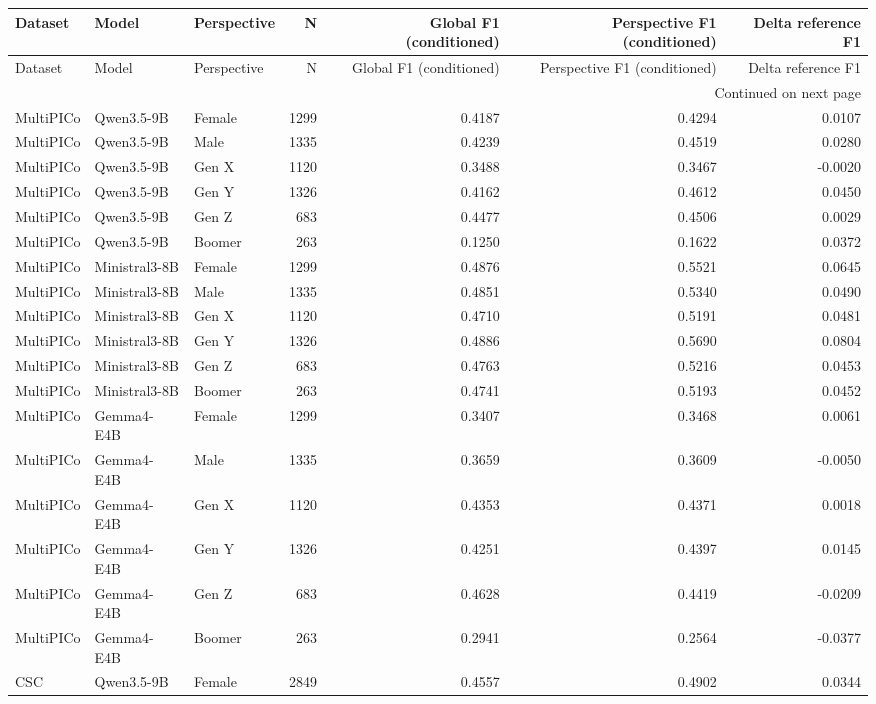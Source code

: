 \begin{longtable}{lllrrrr}
\toprule
Dataset & Model & Perspective & N & Global F1 (conditioned) & Perspective F1 (conditioned) & Delta reference F1 \\
\midrule
\endfirsthead
\toprule
Dataset & Model & Perspective & N & Global F1 (conditioned) & Perspective F1 (conditioned) & Delta reference F1 \\
\midrule
\endhead
\midrule
\multicolumn{7}{r}{Continued on next page} \\
\midrule
\endfoot
\bottomrule
\endlastfoot
MultiPICo & Qwen3.5-9B & Female & 1299 & 0.4187 & 0.4294 & 0.0107 \\
MultiPICo & Qwen3.5-9B & Male & 1335 & 0.4239 & 0.4519 & 0.0280 \\
MultiPICo & Qwen3.5-9B & Gen X & 1120 & 0.3488 & 0.3467 & -0.0020 \\
MultiPICo & Qwen3.5-9B & Gen Y & 1326 & 0.4162 & 0.4612 & 0.0450 \\
MultiPICo & Qwen3.5-9B & Gen Z & 683 & 0.4477 & 0.4506 & 0.0029 \\
MultiPICo & Qwen3.5-9B & Boomer & 263 & 0.1250 & 0.1622 & 0.0372 \\
MultiPICo & Ministral3-8B & Female & 1299 & 0.4876 & 0.5521 & 0.0645 \\
MultiPICo & Ministral3-8B & Male & 1335 & 0.4851 & 0.5340 & 0.0490 \\
MultiPICo & Ministral3-8B & Gen X & 1120 & 0.4710 & 0.5191 & 0.0481 \\
MultiPICo & Ministral3-8B & Gen Y & 1326 & 0.4886 & 0.5690 & 0.0804 \\
MultiPICo & Ministral3-8B & Gen Z & 683 & 0.4763 & 0.5216 & 0.0453 \\
MultiPICo & Ministral3-8B & Boomer & 263 & 0.4741 & 0.5193 & 0.0452 \\
MultiPICo & Gemma4-E4B & Female & 1299 & 0.3407 & 0.3468 & 0.0061 \\
MultiPICo & Gemma4-E4B & Male & 1335 & 0.3659 & 0.3609 & -0.0050 \\
MultiPICo & Gemma4-E4B & Gen X & 1120 & 0.4353 & 0.4371 & 0.0018 \\
MultiPICo & Gemma4-E4B & Gen Y & 1326 & 0.4251 & 0.4397 & 0.0145 \\
MultiPICo & Gemma4-E4B & Gen Z & 683 & 0.4628 & 0.4419 & -0.0209 \\
MultiPICo & Gemma4-E4B & Boomer & 263 & 0.2941 & 0.2564 & -0.0377 \\
CSC & Qwen3.5-9B & Female & 2849 & 0.4557 & 0.4902 & 0.0344 \\

\end{longtable}

